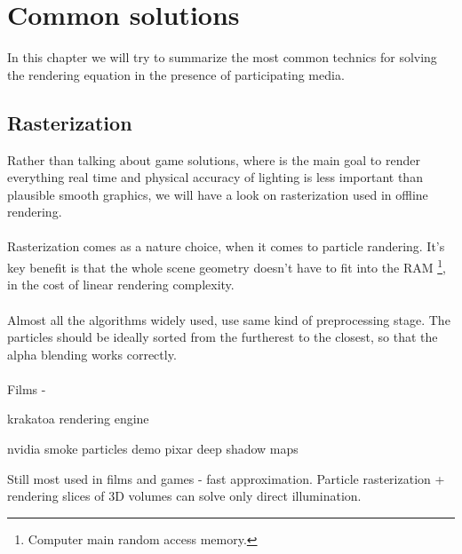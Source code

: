 \chapter{Common solutions}
In this chapter we will try to summarize the most common technics for solving the rendering equation in the presence of participating media.

\section{ Rasterization}
Rather than talking about game solutions, where is the main goal to render everything real time and physical accuracy of lighting is less important than plausible smooth graphics, we will have a look on rasterization used in offline rendering.
\\
\\
Rasterization comes as a nature choice, when it comes to particle randering. It's key benefit is that the whole scene geometry doesn't have to fit into the RAM \footnote{Computer main random access memory.}, in the cost of linear rendering complexity.
\\
\\
Almost all the algorithms widely used, use same kind of preprocessing stage. The particles should be ideally sorted from the furtherest to the closest, so that the alpha blending works correctly.
\\
\\

Films - 

krakatoa rendering engine



nvidia smoke particles demo 
pixar deep shadow maps \cite{LokDSM}

Still most used in films and games - fast approximation.
Particle rasterization + rendering slices of 3D volumes can solve only direct illumination.
